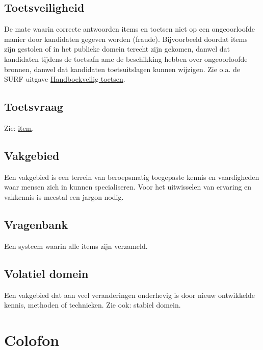 \documentclass[
  letterpaper,
  DIV=11,
  numbers=noendperiod]{scrreprt}
\begin{document}
\hypertarget{toetsveiligheid}{%
\section{Toetsveiligheid}\label{toetsveiligheid}}

De mate waarin correcte antwoorden items en toetsen niet op een
ongeoorloofde manier door kandidaten gegeven worden (fraude).
Bijvoorbeeld doordat items zijn gestolen of in het publieke domein
terecht zijn gekomen, danwel dat kandidaten tijdens de toetsafn ame de
beschikking hebben over ongeoorloofde bronnen, danwel dat kandidaten
toetsuitslagen kunnen wijzigen. Zie o.a. de SURF uitgave
\href{https://www.surf.nl/werkboek-veilig-toetsen}{Handboekveilig
toetsen}.

\hypertarget{toetsvraag}{%
\section{Toetsvraag}\label{toetsvraag}}

Zie: \protect\hyperlink{item}{item}.

\hypertarget{vakgebied}{%
\section{Vakgebied}\label{vakgebied}}

Een vakgebied is een terrein van beroepsmatig toegepaste kennis en
vaardigheden waar mensen zich in kunnen specialiseren. Voor het
uitwisselen van ervaring en vakkennis is meestal een jargon nodig.

\hypertarget{vragenbank}{%
\section{Vragenbank}\label{vragenbank}}

Een systeem waarin alle items zijn verzameld.

\hypertarget{volatiel-domein}{%
\section{Volatiel domein}\label{volatiel-domein}}

Een vakgebied dat aan veel veranderingen onderhevig is door nieuw
ontwikkelde kennis, methoden of technieken. Zie ook: stabiel domein.


\hypertarget{colofon}{%
\chapter{Colofon}\label{colofon}}
\end{document}
